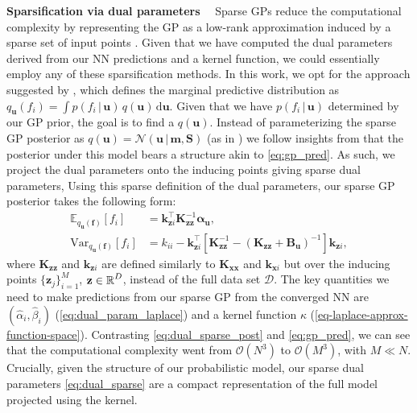 \documentclass{article}
\renewcommand{\paragraph}[1]{{\bf #1}~~}
\newcommand{\dataset}{\ensuremath{\mathcal{D}}}
\newcommand{\mathbold}[1]{\bm{#1}}
\newcommand{\mbf}[1]{\mathbf{#1}}
\renewcommand{\mid}{\,|\,}
\newcommand{\MS}{\mbf{S}}
\newcommand{\T}{\top}
\newcommand{\valpha}[0]{\mathbold{\alpha}}
\newcommand{\MBeta}[0]{\mathbold{B}}
\newcommand{\vm}{\mbf{m}}
\newcommand{\vz}{\mbf{z}}
\newcommand{\vf}{\mbf{f}}
\newcommand{\vu}{\mbf{u}}
\newcommand{\vx}{\mbf{x}}
\newcommand{\MKzz}{\mbf{K}_{\mbf{z}\mbf{z}}}
\newcommand{\MKxx}{\mbf{K}_{\mbf{x}\mbf{x}}}
\newcommand{\vkzs}{\mbf{k}_{\mbf{z}i}}
\newcommand{\vk}{\mbf{k}}
\newcommand{\myexpect}{\mathbb{E}}
\begin{document}
\paragraph{Sparsification via dual parameters}
\label{sec:sparse-dual-gp}
%
Sparse GPs reduce the computational complexity by representing the GP as a low-rank approximation induced by a sparse set of input points \citep[see][for an early overview]{quinonero2005unifying}. Given that we have computed the dual parameters derived from our NN predictions and a kernel function, we could essentially employ any of these sparsification methods. In this work, we opt for the approach suggested by \citet{titsias2009variational} \citep[also used in the DTC approximation, see][]{quinonero2005unifying}, which defines the marginal predictive distribution as $q_{\vu}(f_i)  = \int p(f_i  \mid \vu) \, q(\vu) \, \mathrm{d}\vu$.
Given that we have $p(f_i \mid \vu)$ determined by our GP prior, the goal is to find a $q(\vu)$.
Instead of parameterizing the sparse GP posterior as $q(\vu) = \mathcal{N}\left(\vu \mid \vm, \MS \right)$ (as in \citet{titsias2009variational,hensman2013gaussian})
we follow insights from \citet{adam2021dual} that the posterior under this model bears a structure akin to \cref{eq:gp_pred}.
As such, we project the dual parameters onto the inducing points giving sparse dual parameters,
Using this sparse definition of the dual parameters, our sparse GP posterior takes the following form:
\begin{subequations} \label{eq:dual_sparse_post}
\begin{align}
   \myexpect_{q_{\vu}(\vf)}[f_i] &= \vkzs^{\T} \MKzz^{-1} \valpha_{\vu}, \\
   \textrm{Var}_{q_{\vu}(\vf)}[f_i]  &= k_{ii} - \vkzs^\top [\MKzz^{-1} - (\MKzz + \MBeta_{\vu})^{-1} ]\vkzs, \nonumber
\end{align}
\end{subequations}
where $\MKzz$ and $\vkzs$ are defined similarly to $\MKxx$ and $\vk_{\vx i}$ but over the inducing points $\{\vz_j\}_{i=1}^M$, $\vz \in \R^{D}$, instead of the full data set $\dataset$. The key quantities we need to make predictions from our sparse GP from the converged NN are $(\hat{\alpha}_i, \hat{\beta}_i)$ (\cref{eq:dual_param_laplace}) and a kernel function $\kappa$ (\cref{eq-laplace-approx-function-space}). Contrasting \cref{eq:dual_sparse_post} and \cref{eq:gp_pred}, we can see that the computational complexity went from $\mathcal{O}(N^3)$ to $\mathcal{O}(M^3)$, with $M \ll N$.  Crucially, given the structure of our probabilistic model, our sparse dual parameters \cref{eq:dual_sparse} are a compact representation of the full model projected using the kernel.
\end{document}

